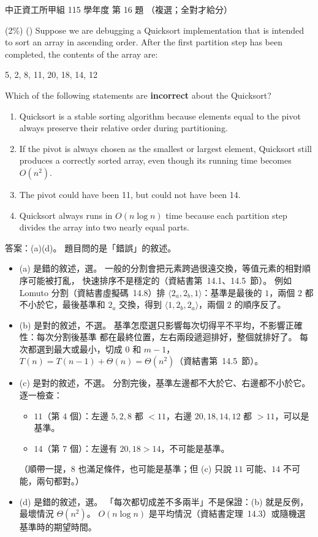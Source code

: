 \begin{pastexam}[label={px:ccu-115-swa-06}]{中正資工所甲組 115 學年度 第 16 題}
（複選；全對才給分）

(2\%) (\qquad) Suppose we are debugging a Quicksort implementation that is intended to sort an array
in ascending order. After the first partition step has been completed, the contents of the array
are:
\begin{center}5, 2, 8, 11, 20, 18, 14, 12\end{center}
Which of the following statements are \textbf{incorrect} about the Quicksort?
\begin{enumerate}[label=(\alph*)]
\item Quicksort is a stable sorting algorithm because elements equal to the pivot always preserve
their relative order during partitioning.
\item If the pivot is always chosen as the smallest or largest element, Quicksort still produces a
correctly sorted array, even though its running time becomes $O(n^2)$.
\item The pivot could have been 11, but could not have been 14.
\item Quicksort always runs in $O(n\log n)$ time because each partition step divides the array into
two nearly equal parts.
\end{enumerate}
\end{pastexam}

\begin{pastsoln}
答案：(a)(d)。 題目問的是「錯誤」的敘述。

\begin{itemize}
\item (a) 是錯的敘述，選。 一般的分割會把元素跨過很遠交換，等值元素的相對順序可能被打亂，
快速排序不是穩定的（資結書第~14.1、14.5~節）。 例如 Lomuto 分割（資結書虛擬碼~14.8）排
$\langle 2_a, 2_b, 1\rangle$：基準是最後的 $1$，兩個 $2$ 都不小於它，最後基準和 $2_a$ 交換，得到
$\langle 1, 2_b, 2_a\rangle$，兩個 $2$ 的順序反了。
\item (b) 是對的敘述，不選。 基準怎麼選只影響每次切得平不平均，不影響正確性：每次分割後基準
都在最終位置，左右兩段遞迴排好，整個就排好了。 每次都選到最大或最小，切成 $0$ 和 $m - 1$，
$T(n) = T(n - 1) + \Theta(n) = \Theta(n^2)$（資結書第~14.5~節）。
\item (c) 是對的敘述，不選。 分割完後，基準左邊都不大於它、右邊都不小於它。 逐一檢查：
\begin{itemize}
\item $11$（第 $4$ 個）：左邊 $5, 2, 8$ 都 $< 11$，右邊 $20, 18, 14, 12$ 都 $> 11$，可以是基準。
\item $14$（第 $7$ 個）：左邊有 $20, 18 > 14$，不可能是基準。
\end{itemize}
（順帶一提，$8$ 也滿足條件，也可能是基準；但 (c) 只說 $11$ 可能、$14$ 不可能，兩句都對。）
\item (d) 是錯的敘述，選。 「每次都切成差不多兩半」不是保證：(b) 就是反例，最壞情況
$\Theta(n^2)$。 $O(n \log n)$ 是平均情況（資結書定理~14.3）或隨機選基準時的期望時間。
\end{itemize}
\end{pastsoln}

